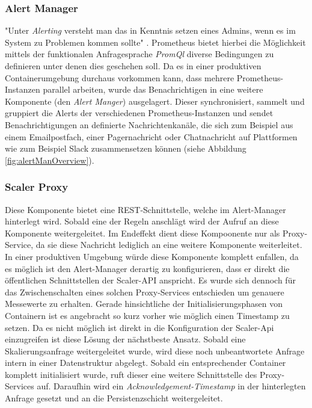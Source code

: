 \subsubsection{Alert Manager}
"Unter \emph{Alerting} versteht man das in Kenntnis setzen eines Admins, wenn es im System zu Problemen kommen sollte" \cite[Kapitel~18]{oreillyPrometheus}. Prometheus bietet hierbei die Möglichkeit mittels der funktionalen Anfragesprache \emph{PromQl} diverse Bedingungen zu definieren unter denen dies geschehen soll. Da es in einer produktiven Containerumgebung durchaus vorkommen kann, dass mehrere Prometheus-Instanzen parallel arbeiten, wurde das Benachrichtigen in eine weitere Komponente (den \emph{Alert Manger}) ausgelagert. Dieser synchronisiert, sammelt und gruppiert die Alerts der verschiedenen Prometheus-Instanzen und sendet Benachrichtigungen an definierte Nachrichtenkanäle, die sich zum Beispiel aus einem Emailpostfach, einer Pagernachricht oder Chatnachricht auf Plattformen wie zum Beispiel Slack zusammensetzen können (siehe Abbildung \ref{fig:alertManOverview}).


\subsubsection{Scaler Proxy}
Diese Komponente bietet eine REST-Schnittstelle, welche im Alert-Manager hinterlegt wird. Sobald eine der Regeln anschlägt wird der Aufruf an diese Komponente weitergeleitet. Im Endeffekt dient diese Kompoonente nur als Proxy-Service, da sie diese Nachricht lediglich an eine weitere Komponente weiterleitet. In einer produktiven Umgebung würde diese Komponente komplett enfallen, da es möglich ist den Alert-Manager derartig zu konfigurieren, dass er direkt die öffentlichen Schnittstellen der Scaler-API anspricht. Es wurde sich dennoch für das Zwischenschalten eines solchen Proxy-Services entschieden um genauere Messewerte zu erhalten. Gerade hinsichtliche der Initialisierungsphasen von Containern ist es angebracht so kurz vorher wie möglich einen Timestamp zu setzen. Da es nicht möglich ist direkt in die Konfiguration der Scaler-Api einzugreifen ist diese Lösung der nächstbeste Ansatz. Sobald eine Skalierungsanfrage weitergeleitet wurde, wird diese noch unbeantwortete Anfrage intern in einer Datenstruktur abgelegt. Sobald ein entsprechender Container komplett initialisiert wurde, ruft dieser eine weitere Schnittstelle des Proxy-Services auf. Daraufhin wird ein \emph{Acknowledgement-Timestamp} in der hinterlegten Anfrage gesetzt und an die Persistenzschicht weitergeleitet. 

